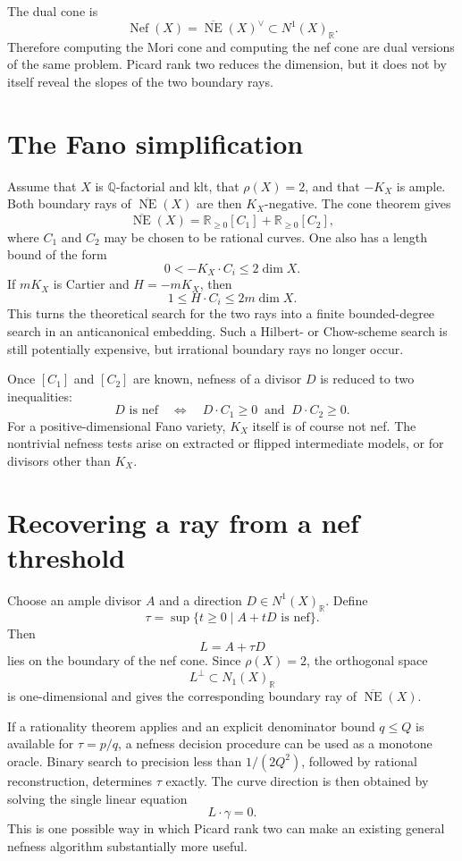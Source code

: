 \documentclass[11pt]{article}
\newcommand{\NE}{\overline{\operatorname{NE}}}
\newcommand{\Nef}{\operatorname{Nef}}
\begin{document}
The dual cone is
\[
  \Nef(X)=\NE(X)^\vee\subset N^1(X)_{\mathbb R}.
\]
Therefore computing the Mori cone and computing the nef cone are dual versions
of the same problem.  Picard rank two reduces the dimension, but it does not
by itself reveal the slopes of the two boundary rays.

\section{The Fano simplification}

Assume that $X$ is $\mathbb Q$-factorial and klt, that $\rho(X)=2$, and that
$-K_X$ is ample.  Both boundary rays of $\NE(X)$ are then $K_X$-negative.
The cone theorem gives
\[
  \NE(X)=\mathbb R_{\geq 0}[C_1]
          +\mathbb R_{\geq 0}[C_2],
\]
where $C_1$ and $C_2$ may be chosen to be rational curves.  One also has a
length bound of the form
\[
  0<-K_X\cdot C_i\leq 2\dim X.
\]
If $mK_X$ is Cartier and $H=-mK_X$, then
\[
  1\leq H\cdot C_i\leq 2m\dim X.
\]
This turns the theoretical search for the two rays into a finite bounded-degree
search in an anticanonical embedding.  Such a Hilbert- or Chow-scheme search is
still potentially expensive, but irrational boundary rays no longer occur.

Once $[C_1]$ and $[C_2]$ are known, nefness of a divisor $D$ is reduced to
two inequalities:
\[
  D\text{ is nef}
  \quad\Longleftrightarrow\quad
  D\cdot C_1\geq 0\ \text{ and }\ D\cdot C_2\geq 0.
\]
For a positive-dimensional Fano variety, $K_X$ itself is of course not nef.
The nontrivial nefness tests arise on extracted or flipped intermediate models,
or for divisors other than $K_X$.

\section{Recovering a ray from a nef threshold}

Choose an ample divisor $A$ and a direction $D\in N^1(X)_{\mathbb R}$.  Define
\[
  \tau=\sup\{t\geq 0\mid A+tD\text{ is nef}\}.
\]
Then
\[
  L=A+\tau D
\]
lies on the boundary of the nef cone.  Since $\rho(X)=2$, the orthogonal space
\[
  L^\perp\subset N_1(X)_{\mathbb R}
\]
is one-dimensional and gives the corresponding boundary ray of $\NE(X)$.

If a rationality theorem applies and an explicit denominator bound $q\leq Q$
is available for $\tau=p/q$, a nefness decision procedure can be used as a
monotone oracle.  Binary search to precision less than $1/(2Q^2)$, followed by
rational reconstruction, determines $\tau$ exactly.  The curve direction is
then obtained by solving the single linear equation
\[
  L\cdot\gamma=0.
\]
This is one possible way in which Picard rank two can make an existing general
nefness algorithm substantially more useful.
\end{document}
